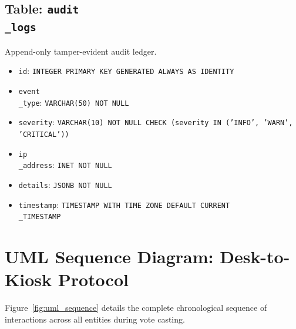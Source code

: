 \documentclass[12pt,a4paper,oneside]{report}
\begin{document}
\subsection{Table: \texttt{audit\\_logs}}
Append-only tamper-evident audit ledger.
\begin{itemize}
    \item \texttt{id}: \texttt{INTEGER PRIMARY KEY GENERATED ALWAYS AS IDENTITY}
    \item \texttt{event\\_type}: \texttt{VARCHAR(50) NOT NULL}
    \item \texttt{severity}: \texttt{VARCHAR(10) NOT NULL CHECK (severity IN ('INFO', 'WARN', 'CRITICAL'))}
    \item \texttt{ip\\_address}: \texttt{INET NOT NULL}
    \item \texttt{details}: \texttt{JSONB NOT NULL}
    \item \texttt{timestamp}: \texttt{TIMESTAMP WITH TIME ZONE DEFAULT CURRENT\\_TIMESTAMP}
\end{itemize}

\section{UML Sequence Diagram: Desk-to-Kiosk Protocol}
Figure~\ref{fig:uml_sequence} details the complete chronological sequence of interactions across all entities during vote casting.
\end{document}
